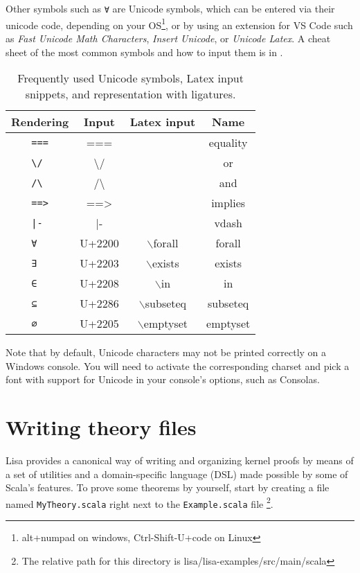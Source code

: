 Other symbols such as \lstinline|∀| are Unicode symbols, which can be entered
via their unicode code, depending on your OS\footnote{alt+numpad on windows,
Ctrl-Shift-U+code on Linux}, or by using an extension for VS Code such as
\emph{Fast Unicode Math Characters}, \emph{Insert Unicode}, or \emph{Unicode
Latex}. A cheat sheet of the most common symbols and how to input them is in
.
%
\begin{table}
  \center
  \begin{tabular}{c|c|c|c}
    Rendering         & Input            & Latex input & Name     \\ \hline
    \lstinline| === | & ===              & & equality \\ \hline
    \lstinline| \/  | & \textbackslash / & & or       \\ \hline
    \lstinline| /\  | & /\textbackslash  & & and      \\ \hline
    \lstinline| ==> | & ==>              & & implies  \\ \hline
    \lstinline+ |-  + &  |-              & & vdash    \\ \hline
    \lstinline| ∀   | & U+2200           & \(\backslash\)forall & forall   \\ \hline
    \lstinline| ∃   | & U+2203           & \(\backslash\)exists & exists   \\ \hline
    \lstinline| ∈   | & U+2208           & \(\backslash\)in & in       \\ \hline
    \lstinline| ⊆   | & U+2286           & \(\backslash\)subseteq & subseteq \\ \hline
    \lstinline| ∅   | & U+2205           & \(\backslash\)emptyset & emptyset \\
  \end{tabular}
  \caption{Frequently used Unicode symbols, Latex input snippets, and representation with ligatures.}
  \label{tab:Unicode}
\end{table}
Note that by default, Unicode characters may not be printed correctly on a
Windows console. You will need to activate the corresponding charset and pick a
font with support for Unicode in your console's options, such as Consolas.

\section{Writing theory files}
Lisa provides a canonical way of writing and organizing kernel proofs by means
of a set of utilities and a domain-specific language (DSL) made possible by some
of Scala's features. To prove some theorems by yourself, start by creating a
file named \lstinline|MyTheory.scala| right next to the
\lstinline|Example.scala| file \footnote{The relative path for this directory is
lisa/lisa-examples/src/main/scala}.

